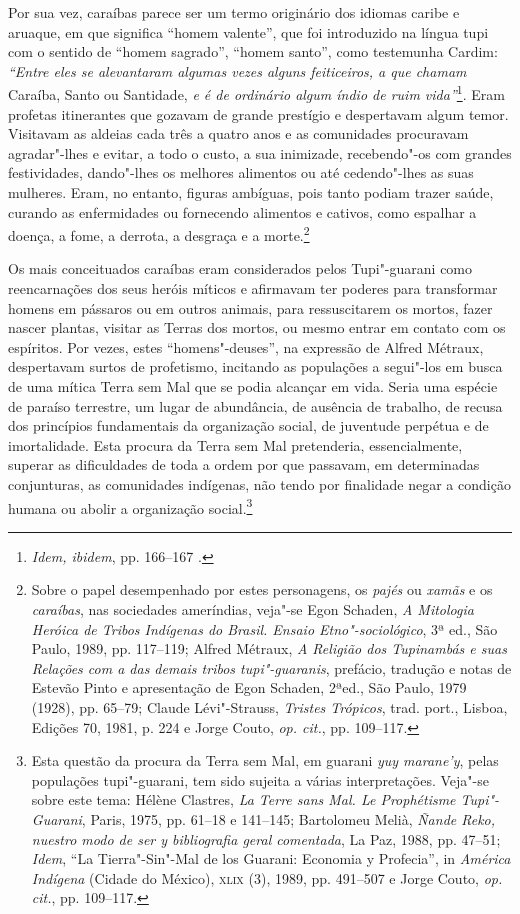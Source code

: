 Por sua vez, caraíbas parece ser um termo originário dos
idiomas caribe e aruaque, em que significa ``homem valente'', que foi
introduzido na língua tupi com o sentido de ``homem sagrado'', ``homem
santo'', como testemunha Cardim: \textit{``Entre eles se
alevantaram algumas vezes alguns feiticeiros, a que chamam} Caraíba,
Santo ou Santidade, \textit{e é de ordinário algum índio de ruim 
vida''}\footnote{ \textit{Idem, ibidem}, pp. 166--167 .}. Eram profetas
itinerantes que gozavam de grande prestígio e despertavam algum temor.
Visitavam as aldeias cada três a quatro anos e as comunidades
procuravam agradar"-lhes e evitar, a todo o custo, a sua inimizade,
recebendo"-os com grandes festividades, dando"-lhes os melhores alimentos
ou até cedendo"-lhes as suas mulheres. Eram, no entanto, figuras
ambíguas, pois tanto podiam trazer saúde, curando as enfermidades ou
fornecendo alimentos e cativos, como espalhar a doença, a fome, a
derrota, a desgraça e a morte.\footnote{ Sobre o papel
desempenhado por estes personagens, os \textit{pajés} ou \textit{xamãs}
e os \textit{caraíbas}, nas sociedades ameríndias, veja"-se Egon
Schaden, \textit{A Mitologia Heróica de Tribos Indígenas do Brasil.
Ensaio Etno"-sociológico}, 3ª ed., São Paulo, 1989, pp. 117--119; Alfred
Métraux, \textit{A Religião dos Tupinambás e suas Relações com a das
demais tribos tupi"-guaranis}, prefácio, tradução e notas de Estevão
Pinto e apresentação de Egon Schaden, 2ªed., São Paulo, 1979 (1928),
pp. 65--79; Claude Lévi"-Strauss, \textit{Tristes Trópicos}, trad. port.,
Lisboa, Edições 70, 1981, p. 224 e Jorge Couto, \textit{op. cit.}, pp. 109--117.} 

 Os mais conceituados caraíbas eram considerados pelos
Tupi"-guarani como reencarnações dos seus heróis míticos e afirmavam
ter poderes para transformar homens em pássaros ou em outros animais,
para ressuscitarem os mortos, fazer nascer plantas, visitar as Terras
dos mortos, ou mesmo entrar em contato com os espíritos. Por vezes,
estes ``homens"-deuses'', na expressão de Alfred Métraux, despertavam
surtos de profetismo, incitando as populações a segui"-los em busca de
uma mítica Terra sem Mal que se podia alcançar em vida. Seria uma
espécie de paraíso terrestre, um lugar de abundância, de ausência de
trabalho, de recusa dos princípios fundamentais da organização social,
de juventude perpétua e de imortalidade. Esta procura da Terra sem Mal
pretenderia, essencialmente, superar as dificuldades de toda a ordem
por que passavam, em determinadas conjunturas, as comunidades indígenas,
não tendo por finalidade negar a condição humana ou abolir a
organização social.\footnote{ Esta questão da procura da Terra sem
Mal, em guarani \textit{yuy marane'y}, pelas populações tupi"-guarani, 
tem sido sujeita a várias interpretações. Veja"-se sobre este tema:
Hélène Clastres, \textit{La Terre sans Mal. Le Prophétisme
Tupi"-Guarani}, Paris, 1975, pp. 61--18 e 141--145; Bartolomeu Melià,
\textit{Ñande Reko, nuestro modo de ser y bibliografia geral comentada}, 
La Paz, 1988, pp. 47--51; \textit{Idem}, ``La Tierra"-Sin"-Mal de los Guarani:
Economia y Profecia'', in \textit{América Indígena} (Cidade do México),
\textsc{xlix} (3), 1989, pp. 491--507 e Jorge Couto, \textit{op. cit.}, pp. 109--117.} 

